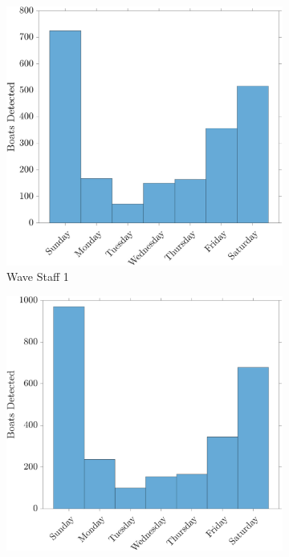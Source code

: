 \documentclass[
10pt, %
letterpaper, %
twoside, %
headinclude,footinclude, %
BCOR5mm, %
]{scrartcl}
\begin{document}
\newpage
\printbibliography
\newpage
\begin{figure}[h!]
	\centering
	\begin{subfigure}[t]{0.49\linewidth}
		\centering
		\includegraphics[width=\linewidth]{figures/WeekDayHist_LOG1.pdf}
		\caption{Wave Staff 1} 
		\label{fig:WeekL1}
	\end{subfigure}
	\begin{subfigure}[t]{0.49\linewidth}
		\centering
		\includegraphics[width=\linewidth]{figures/WeekDayHist_LOG2.pdf}

\end{subfigure}
\end{figure}
\end{document}
